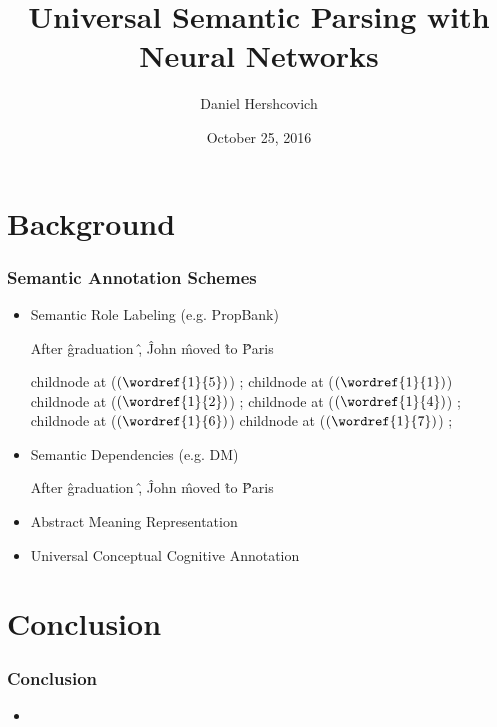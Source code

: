 \documentclass[t]{beamer}
\begin{document}
\title[]{Universal Semantic Parsing with Neural Networks}
\author{Daniel Hershcovich}
\date{October 25, 2016}

\begin{frame}
\titlepage
\end{frame}


\section{Background}

\begin{frame}
\frametitle{Semantic Annotation Schemes}
\begin{itemize}[<+>]
 \item Semantic Role Labeling (e.g. PropBank)
	\begin{dependency}[theme = simple]
	\begin{deptext}[column sep=.7em,ampersand replacement=\^]
	After \^ graduation \^ , \^ John \^ moved \^ to \^ Paris \\
	\end{deptext}
	child{node at ($(\wordref{1}{5})$) {}};
	child{node at ($(\wordref{1}{1})$) {}}
	child{node at ($(\wordref{1}{2})$) {}};
	child{node at ($(\wordref{1}{4})$) {}};
	child{node at ($(\wordref{1}{6})$) {}}
	child{node at ($(\wordref{1}{7})$) {}};
	\end{dependency}
 \item Semantic Dependencies (e.g. DM)
	\begin{dependency}[theme = simple]
	\begin{deptext}[column sep=.7em,ampersand replacement=\^]
	After \^ graduation \^ , \^ John \^ moved \^ to \^ Paris \\
	\end{deptext}
	\end{dependency}
 \item Abstract Meaning Representation
 \item Universal Conceptual Cognitive Annotation
\end{itemize}
\end{frame}


\section[]{Conclusion}

\begin{frame}
\frametitle{Conclusion}
\begin{itemize}
 \item 
\end{itemize}
\end{frame}
\end{document}
